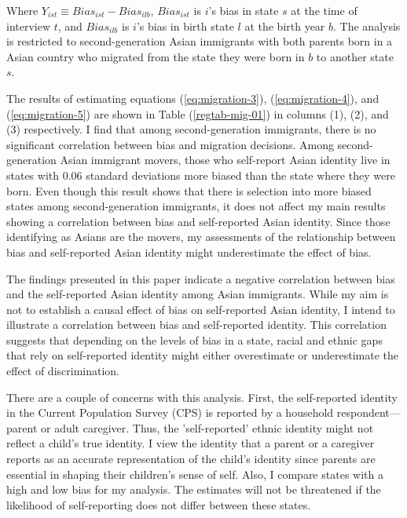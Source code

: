 Where $Y_{ist} \equiv Bias_{ist} -  Bias_{ilb}$, $Bias_{ist}$ is $i$'s bias in state $s$ at the time of interview $t$, and  $Bias_{ilb}$ is $i$'s bias in birth state $l$ at the birth year $b$. The analysis is restricted to second-generation Asian immigrants with both parents born in a Asian country who migrated from the state they were born in $b$ to another state $s$. 

The results of estimating equations (\ref{eq:migration-3}), (\ref{eq:migration-4}), and (\ref{eq:migration-5}) are shown in Table (\ref{regtab-mig-01}) in columns (1), (2), and (3) respectively. I find that among second-generation immigrants, there is no significant correlation between bias and migration decisions. Among second-generation Asian immigrant movers, those who self-report Asian identity live in states with 0.06 standard deviations more biased than the state where they were born. Even though this result shows that there is selection into more biased states among second-generation immigrants, it does not affect my main results showing a correlation between bias and self-reported Asian identity. Since those identifying as Asians are the movers, my assessments of the relationship between bias and self-reported Asian identity might underestimate the effect of bias.

The findings presented in this paper indicate a negative correlation between bias and the self-reported Asian identity among Asian immigrants. While my aim is not to establish a causal effect of bias on self-reported Asian identity, I intend to illustrate a correlation between bias and self-reported identity. This correlation suggests that depending on the levels of bias in a state, racial and ethnic gaps that rely on self-reported identity might either overestimate or underestimate the effect of discrimination.

There are a couple of concerns with this analysis. First, the self-reported identity in the Current Population Survey (CPS) is reported by a household respondent—parent or adult caregiver. Thus, the 'self-reported' ethnic identity might not reflect a child's true identity. I view the identity that a parent or a caregiver reports as an accurate representation of the child's identity since parents are essential in shaping their children's sense of self. Also, I compare states with a high and low bias for my analysis. The estimates will not be threatened if the likelihood of self-reporting does not differ between these states.

